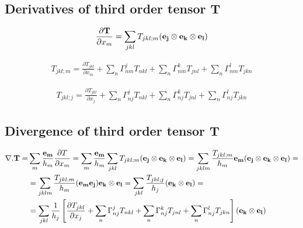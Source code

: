 \documentclass[11pt]{article}
\begin{document}
\subsection{Derivatives of third order tensor T}

\begin{align}
\frac{\partial {\bf{T}}}{\partial x_m} = \sum_{jkl} T_{jkl;m} ({\bf{e_j}} \otimes {\bf{e_k}} \otimes {\bf{e_l}}) 
\end{align}

\begin{align}
T_{jkl;m} = \frac{\partial T_{jkl}}{\partial x_m} + \sum_n \Gamma_{nm}^j T_{nkl} + \sum_n \Gamma_{nm}^k T_{jnl} + \sum_n \Gamma_{nm}^l T_{jkn}
\end{align}

\begin{align}
T_{jkl;j} = \frac{\partial T_{jkl}}{\partial x_j} + \sum_n \Gamma_{nj}^j T_{nkl} + \sum_n \Gamma_{nj}^k T_{jnl} + \sum_n \Gamma_{nj}^l T_{jkn}
\end{align}

\subsection{Divergence of third order tensor T}


\begin{align}
\nabla . {\bf{T}} = & \sum_m \frac{{\bf{e_m}}}{h_m} \frac{\partial T}{\partial x_m} = \sum_m \frac{{\bf{e_m}}}{h_m} \sum_{jkl} T_{jkl;m} ({\bf{e_j}} \otimes {\bf{e_k}} \otimes {\bf{e_l}}) = \sum_{jklm} \frac{T_{jkl;m}}{h_m} {\bf{e_m}}({\bf{e_j}} \otimes {\bf{e_k}} \otimes {\bf{e_l}}) = \\
& = \sum_{jklm} \frac{T_{jkl;m}}{h_m} ({\bf{e_m}}{\bf{e_j}}){\bf{e_k}} \otimes {\bf{e_l}} = \sum_{jkl} \frac{T_{jkl;j}}{h_j} ({\bf{e_k}} \otimes {\bf{e_l}}) = \\ 
& = \sum_{jkl} \frac{1}{h_j} \left[ \frac{\partial T_{jkl}}{\partial x_j} + \sum_n \Gamma_{nj}^j T_{nkl} + \sum_n \Gamma_{nj}^k T_{jnl} + \sum_n \Gamma_{nj}^l T_{jkn} \right]  ({\bf{e_k}} \otimes {\bf{e_l}})
\end{align}

\end{document}
